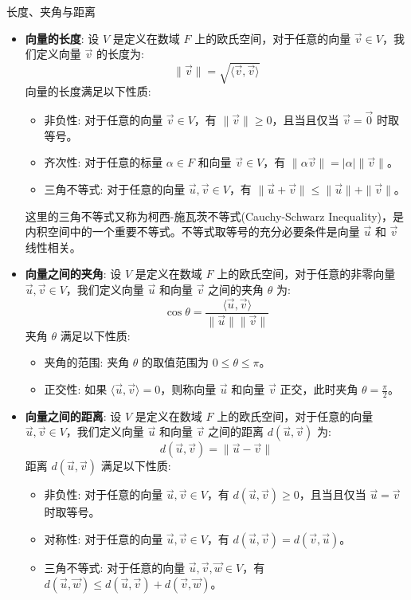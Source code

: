 \documentclass[a4paper,12pt]{ctexart}
\begin{document}
    \begin{mydef}{长度、夹角与距离}{}
    \begin{itemize}
    \item \textbf{向量的长度}: 设 $V$ 是定义在数域 $F$ 上的欧氏空间，对于任意的向量 $\vec{v} \in V$，我们定义向量 $\vec{v}$ 的长度为:
    \[
    \|\vec{v}\| = \sqrt{\langle \vec{v}, \vec{v} \rangle}
    \]
    向量的长度满足以下性质:
    \begin{itemize}
        \item 非负性: 对于任意的向量 $\vec{v} \in V$，有 $\|\vec{v}\| \geq 0$，且当且仅当 $\vec{v} = \vec{0}$ 时取等号。
        \item 齐次性: 对于任意的标量 $\alpha \in F$ 和向量 $\vec{v} \in V$，有 $\|\alpha \vec{v}\| = |\alpha| \|\vec{v}\|$。
        \item 三角不等式: 对于任意的向量 $\vec{u}, \vec{v} \in V$，有 $\|\vec{u} + \vec{v}\| \leq \|\vec{u}\| + \|\vec{v}\|$。
    \end{itemize}
    这里的三角不等式又称为柯西-施瓦茨不等式(Cauchy-Schwarz Inequality)，是内积空间中的一个重要不等式。不等式取等号的充分必要条件是向量 $\vec{u}$ 和 $\vec{v}$ 线性相关。
    
    \item \textbf{向量之间的夹角}: 设 $V$ 是定义在数域 $F$ 上的欧氏空间，对于任意的非零向量 $\vec{u}, \vec{v} \in V$，我们定义向量 $\vec{u}$ 和向量 $\vec{v}$ 之间的夹角 $\theta$ 为:
    \[
    \cos \theta = \frac{\langle \vec{u}, \vec{v} \rangle}{\|\vec{u}\| \|\vec{v}\|}
    \]
    夹角 $\theta$ 满足以下性质:
    \begin{itemize}
        \item 夹角的范围: 夹角 $\theta$ 的取值范围为 $0 \leq \theta \leq \pi$。
        \item 正交性: 如果 $\langle \vec{u}, \vec{v} \rangle = 0$，则称向量 $\vec{u}$ 和向量 $\vec{v}$ 正交，此时夹角 $\theta = \frac{\pi}{2}$。
    \end{itemize}
    
    \item \textbf{向量之间的距离}: 设 $V$ 是定义在数域 $F$ 上的欧氏空间，对于任意的向量 $\vec{u}, \vec{v} \in V$，我们定义向量 $\vec{u}$ 和向量 $\vec{v}$ 之间的距离 $d(\vec{u}, \vec{v})$ 为:
    \[
    d(\vec{u}, \vec{v}) = \|\vec{u} - \vec{v}\|
    \]
    距离 $d(\vec{u}, \vec{v})$ 满足以下性质:
    \begin{itemize}
        \item 非负性: 对于任意的向量 $\vec{u}, \vec{v} \in V$，有 $d(\vec{u}, \vec{v}) \geq 0$，且当且仅当 $\vec{u} = \vec{v}$ 时取等号。
        \item 对称性: 对于任意的向量 $\vec{u}, \vec{v} \in V$，有 $d(\vec{u}, \vec{v}) = d(\vec{v}, \vec{u})$。
        \item 三角不等式: 对于任意的向量 $\vec{u}, \vec{v}, \vec{w} \in V$，有 $d(\vec{u}, \vec{w}) \leq d(\vec{u}, \vec{v}) + d(\vec{v}, \vec{w})$。
    \end{itemize}
    \end{itemize}
    \end{mydef}
\end{document}
